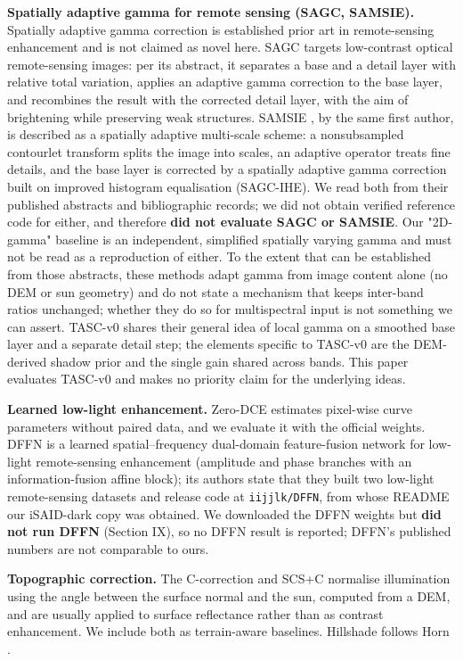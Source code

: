 \documentclass[conference]{IEEEtran}
\begin{document}
\textbf{Spatially adaptive gamma for remote sensing (SAGC, SAMSIE).} Spatially adaptive gamma correction is established prior art in remote-sensing enhancement and is not claimed as novel here. SAGC \cite{huang2018sagc} targets low-contrast optical remote-sensing images: per its abstract, it separates a base and a detail layer with relative total variation, applies an adaptive gamma correction to the base layer, and recombines the result with the corrected detail layer, with the aim of brightening while preserving weak structures. SAMSIE \cite{huang2022samsie}, by the same first author, is described as a spatially adaptive multi-scale scheme: a nonsubsampled contourlet transform splits the image into scales, an adaptive operator treats fine details, and the base layer is corrected by a spatially adaptive gamma correction built on improved histogram equalisation (SAGC-IHE). We read both from their published abstracts and bibliographic records; we did not obtain verified reference code for either, and therefore \textbf{did not evaluate SAGC or SAMSIE}. Our "2D-gamma" baseline is an independent, simplified spatially varying gamma and must not be read as a reproduction of either. To the extent that can be established from those abstracts, these methods adapt gamma from image content alone (no DEM or sun geometry) and do not state a mechanism that keeps inter-band ratios unchanged; whether they do so for multispectral input is not something we can assert. TASC-v0 shares their general idea of local gamma on a smoothed base layer and a separate detail step; the elements specific to TASC-v0 are the DEM-derived shadow prior and the single gain shared across bands. This paper evaluates TASC-v0 and makes no priority claim for the underlying ideas.

\textbf{Learned low-light enhancement.} Zero-DCE \cite{guo2020zerodce} estimates pixel-wise curve parameters without paired data, and we evaluate it with the official weights. DFFN \cite{yao2024dffn} is a learned spatial--frequency dual-domain feature-fusion network for low-light remote-sensing enhancement (amplitude and phase branches with an information-fusion affine block); its authors state that they built two low-light remote-sensing datasets and release code at \texttt{iijjlk/DFFN}, from whose README our iSAID-dark copy was obtained. We downloaded the DFFN weights but \textbf{did not run DFFN} (Section IX), so no DFFN result is reported; DFFN's published numbers are not comparable to ours.

\textbf{Topographic correction.} The C-correction \cite{teillet1982ccorr} and SCS+C \cite{soenen2005scsc} normalise illumination using the angle between the surface normal and the sun, computed from a DEM, and are usually applied to surface reflectance rather than as contrast enhancement. We include both as terrain-aware baselines. Hillshade follows Horn \cite{horn1981hillshading}.
\end{document}
